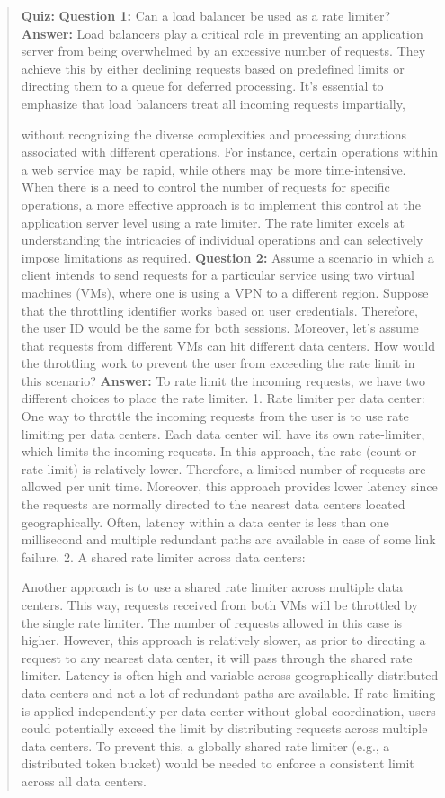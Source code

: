 \begin{quote}
\textbf{Quiz:}
\textbf{Question 1:} Can a load balancer be used as a rate limiter?
\textbf{Answer:} Load balancers play a critical role in preventing an application server from being overwhelmed by an excessive number of requests. They achieve this by either declining requests based on predefined limits or directing them to a queue for deferred processing. It's essential to emphasize that load balancers treat all incoming requests impartially,

without recognizing the diverse complexities and processing durations associated with different operations. For instance, certain operations within a web service may be rapid, while others may be more time-intensive. When there is a need to control the number of requests for specific operations, a more effective approach is to implement this control at the application server level using a rate limiter. The rate limiter excels at understanding the intricacies of individual operations and can selectively impose limitations as required.
\textbf{Question 2:} Assume a scenario in which a client intends to send requests for a particular service using two virtual machines (VMs), where one is using a VPN to a different region. Suppose that the throttling identifier works based on user credentials. Therefore, the user ID would be the same for both sessions. Moreover, let's assume that requests from different VMs can hit different data centers. How would the throttling work to prevent the user from exceeding the rate limit in this scenario?
\textbf{Answer:} To rate limit the incoming requests, we have two different choices to place the rate limiter. 1. Rate limiter per data center: One way to throttle the incoming requests from the user is to use rate limiting per data centers. Each data center will have its own rate-limiter, which limits the incoming requests. In this approach, the rate (count or rate limit) is relatively lower. Therefore, a limited number of requests are allowed per unit time. Moreover, this approach provides lower latency since the requests are normally directed to the nearest data centers located geographically. Often, latency within a data center is less than one millisecond and multiple redundant paths are available in case of some link failure. 2. A shared rate limiter across data centers:

Another approach is to use a shared rate limiter across multiple data centers. This way, requests received from both VMs will be throttled by the single rate limiter. The number of requests allowed in this case is higher. However, this approach is relatively slower, as prior to directing a request to any nearest data center, it will pass through the shared rate limiter. Latency is often high and variable across geographically distributed data centers and not a lot of redundant paths are available. If rate limiting is applied independently per data center without global coordination, users could potentially exceed the limit by distributing requests across multiple data centers. To prevent this, a globally shared rate limiter (e.g., a distributed token bucket) would be needed to enforce a consistent limit across all data centers.
\end{quote}


